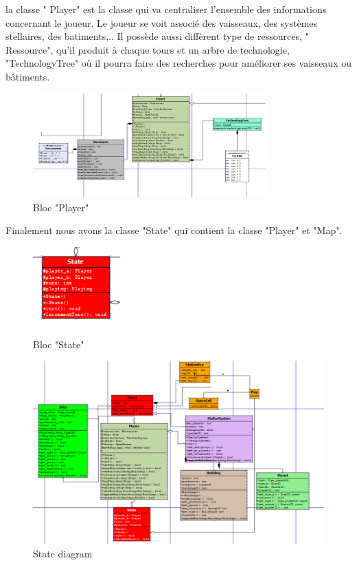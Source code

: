 la classe " Player" est la classe qui va centraliser l'ensemble des informations concernant le joueur. Le joueur se voit associé des vaisseaux, des systèmes stellaires, des batiments,.. Il possède aussi diffèrent type de ressources, " Ressource", qu'il produit à chaque tours et un arbre de technologie,  "TechnologyTree" où il pourra faire des recherches pour améliorer ses vaisseaux ou bâtiments. 

\begin{figure}[!h]
\centering
\includegraphics[width=0.8\textwidth]{pics/classe_player.PNG}
\caption[Bloc "Player"]{\label{figure_simple}Bloc "Player"}
\end{figure}

Finalement nous avons la classe "State" qui contient la classe "Player" et "Map".


\begin{figure}[!h]
\centering
\includegraphics[width=0.3\textwidth]{pics/classe_state.PNG}
\caption[Bloc "State"]{\label{figure_simple}Bloc "State"}
\end{figure}

\begin{figure}[!h]
\centering
\includegraphics[width=1\textwidth]{pics/ensemble_classe.PNG}
\caption[State diagram]{\label{figure_simple}State diagram}
\end{figure}